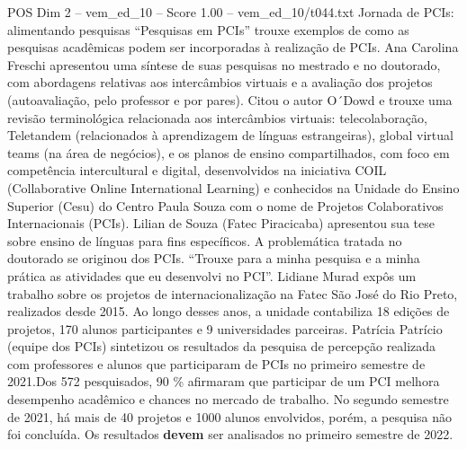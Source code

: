 \begin{textsample}{POS Dim 2 – vem\_ed\_10 – Score 1.00 – vem\_ed\_10/t044.txt}  \label{ex:f2_pos_188}
Jornada de PCIs: alimentando pesquisas “Pesquisas em PCIs” trouxe exemplos de como as pesquisas acadêmicas podem ser incorporadas à realização de PCIs.
Ana Carolina Freschi apresentou uma síntese de suas pesquisas no mestrado e no doutorado, com abordagens relativas aos intercâmbios virtuais e a avaliação dos projetos (autoavaliação, pelo professor e por pares).
Citou o autor O´Dowd e trouxe uma revisão terminológica relacionada aos intercâmbios virtuais: telecolaboração, Teletandem (relacionados à aprendizagem de línguas estrangeiras), global virtual teams (na área de negócios), e os planos de ensino compartilhados, com foco em competência intercultural e digital, desenvolvidos na iniciativa COIL (Collaborative Online International Learning) e conhecidos na Unidade do Ensino Superior (Cesu) do Centro Paula Souza com o nome de Projetos Colaborativos Internacionais (PCIs).
Lilian de Souza (Fatec Piracicaba) apresentou sua tese sobre ensino de línguas para fins específicos.
A problemática tratada no doutorado se originou dos PCIs. “Trouxe para a minha pesquisa e a minha prática as atividades que eu desenvolvi no PCI”.
Lidiane Murad expôs um trabalho sobre os projetos de internacionalização na Fatec São José do Rio Preto, realizados desde 2015.
Ao longo desses anos, a unidade contabiliza 18 edições de projetos, 170 alunos participantes e 9 universidades parceiras.
Patrícia Patrício (equipe dos PCIs) sintetizou os resultados da pesquisa de percepção realizada com professores e alunos que participaram de PCIs no primeiro semestre de 2021.Dos 572 pesquisados, 90 \% afirmaram que participar de um PCI melhora desempenho acadêmico e chances no mercado de trabalho.
No segundo semestre de 2021, há mais de 40 projetos e 1000 alunos envolvidos, porém, a pesquisa não foi concluída.
Os resultados \textbf{devem} ser analisados no primeiro semestre de 2022.

\end{textsample}
